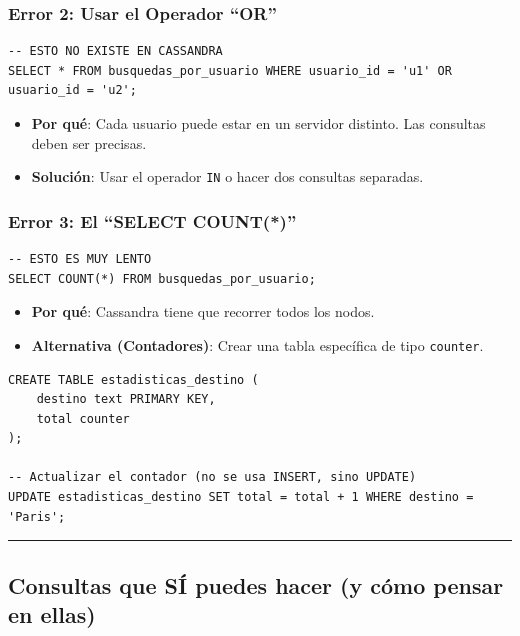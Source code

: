 \documentclass[12pt,a4paper]{article}
\begin{document}
\subsubsection{Error 2: Usar el Operador \enquote{OR}}

\begin{lstlisting}[language=CQL]
-- ESTO NO EXISTE EN CASSANDRA
SELECT * FROM busquedas_por_usuario WHERE usuario_id = 'u1' OR usuario_id = 'u2';
\end{lstlisting}

\begin{itemize}
    \item \textbf{Por qué}: Cada usuario puede estar en un servidor distinto. Las consultas deben ser precisas.
    \item \textbf{Solución}: Usar el operador \texttt{IN} o hacer dos consultas separadas.
\end{itemize}

\subsubsection{Error 3: El \enquote{SELECT COUNT(*)}}

\begin{lstlisting}[language=CQL]
-- ESTO ES MUY LENTO
SELECT COUNT(*) FROM busquedas_por_usuario;
\end{lstlisting}

\begin{itemize}
    \item \textbf{Por qué}: Cassandra tiene que recorrer todos los nodos.
    \item \textbf{Alternativa (Contadores)}: Crear una tabla específica de tipo \texttt{counter}.
\end{itemize}

\begin{lstlisting}[language=CQL]
CREATE TABLE estadisticas_destino (
    destino text PRIMARY KEY,
    total counter
);

-- Actualizar el contador (no se usa INSERT, sino UPDATE)
UPDATE estadisticas_destino SET total = total + 1 WHERE destino = 'Paris';
\end{lstlisting}

\begin{center}\rule{0.5\linewidth}{0.5pt}\end{center}

\subsection{Consultas que SÍ puedes hacer (y cómo pensar en ellas)}\label{consultas-que-si-puedes-hacer}
\end{document}
